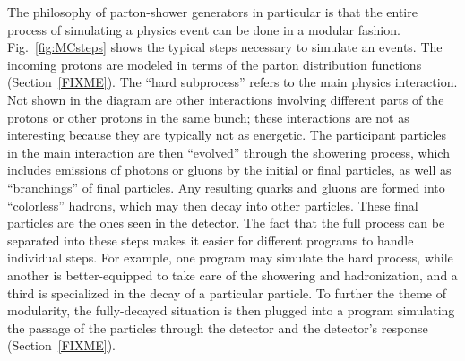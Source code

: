 

The philosophy of parton-shower generators 
in particular 
is that the entire process of simulating 
a physics event can be done in a modular fashion.  
Fig.~\ref{fig:MCsteps} 
shows the typical steps necessary to simulate an events.  
The incoming protons are modeled in terms of the 
parton distribution functions (Section~\ref{FIXME}).  %
The ``hard subprocess'' refers to the main 
physics interaction.  
Not shown in the diagram are other interactions 
involving different parts of the protons 
or other protons in the same bunch; 
these interactions are not as interesting 
because they are typically not as energetic.  
The participant particles in the main interaction 
are then ``evolved'' through the showering process, 
which includes emissions of photons or gluons 
by the initial or final particles, 
as well as ``branchings'' of final particles. %
Any resulting quarks and gluons are 
formed into ``colorless'' hadrons, %
which may then decay into other particles. 
These final particles are the ones seen 
in the detector.  
The fact that the full process can be separated 
into these steps 
makes it easier for different programs 
to handle individual steps.  
For example, one program may simulate the 
hard process, 
while another is better-equipped to take care 
of the showering and hadronization, 
and a third is specialized in the decay of 
a particular particle.  
To further the theme of modularity, 
the fully-decayed situation 
is then plugged into a program simulating 
the passage of the particles through the detector 
and the detector's response (Section~\ref{FIXME}).  

